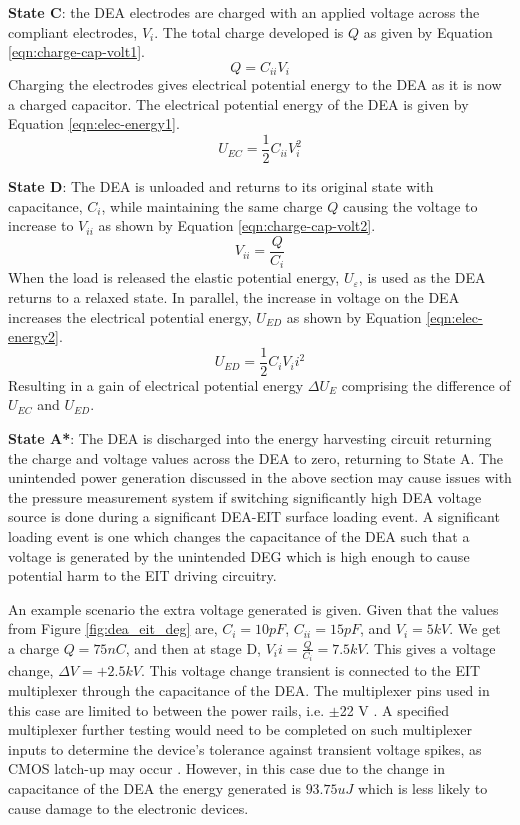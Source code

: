 \textbf{State C}: the DEA electrodes are charged with an applied voltage across the compliant electrodes, $V_i$. The total charge developed is $Q$ as given by Equation \ref{eqn:charge-cap-volt1}.
\begin{equation}
	Q = C_{ii}V_{i}
	\label{eqn:charge-cap-volt1}
\end{equation}
Charging the electrodes gives electrical potential energy to the DEA as it is now a charged capacitor. The electrical potential energy of the DEA is given by Equation \ref{eqn:elec-energy1}.
\begin{equation}
	U_{EC} = \frac{1}{2}C_{ii}V_i^2
	\label{eqn:elec-energy1}
\end{equation}

\textbf{State D}: The DEA is unloaded and returns to its original state with capacitance, $C_i$, while maintaining the same charge $Q$ causing the voltage to increase to $V_{ii}$ as shown by Equation \ref{eqn:charge-cap-volt2}.
\begin{equation}
	V_{ii} = \frac{Q}{C_{i}}
	\label{eqn:charge-cap-volt2}
\end{equation}
When the load is released the elastic potential energy, $U_{\varepsilon}$, is used as the DEA returns to a relaxed state. In parallel, the increase in voltage on the DEA increases the electrical potential energy, $U_{ED}$ as shown by Equation \ref{eqn:elec-energy2}.
\begin{equation}
	U_{ED} = \frac{1}{2}C_{i}V_ii^2
	\label{eqn:elec-energy2}
\end{equation}
Resulting in a gain of electrical potential energy $\Delta U_E$ comprising the difference of $U_{EC}$ and $U_{ED}$.

\textbf{State A*}: The DEA is discharged into the energy harvesting circuit returning the charge and voltage values across the DEA to zero, returning to State A. 
The unintended power generation discussed in the above section may cause issues with the pressure measurement system if switching significantly high DEA voltage source is done during a significant DEA-EIT surface loading event. A significant loading event is one which changes the capacitance of the DEA such that a voltage is generated by the unintended DEG which is high enough to cause potential harm to the EIT driving circuitry. 

An example scenario the extra voltage generated is given. Given that the values from Figure \ref{fig:dea_eit_deg} are, $C_i = 10 pF$, $C_{ii} = 15 pF$, and $V_i = 5 kV$. We get a charge $Q = 75 nC$, and then at stage D, $V_ii = \frac{Q}{C_{i}} = 7.5 kV$. This gives a voltage change, $\Delta V = +2.5 kV$. This voltage change transient is connected to the EIT multiplexer through the capacitance of the DEA.
The multiplexer pins used in this case are limited to between the power rails, i.e. $\pm$22 V \cite{VishayPG2018}. A specified multiplexer further testing would need to be completed on such multiplexer inputs to determine the device's tolerance against transient voltage spikes, as CMOS latch-up may occur \cite{Redmond2001} . 
However, in this case due to the change in capacitance of the DEA the energy generated is $93.75 uJ$ which is less likely to cause damage to the electronic devices.



